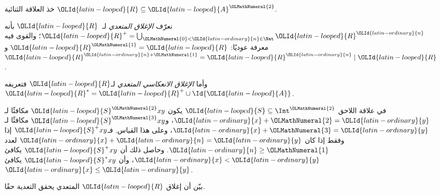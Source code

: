 \documentclass[../../../include/open-logic-section]{subfiles}
\begin{document}
\begin{defn}
خذ العلاقة الثنائية $\OLId{latin-looped}{R} \subseteq \OLId{latin-looped}{A}^\OLMathNumeral{2}$.

نعرّف \emph{الإغلاق المتعدي} لـ~$\OLId{latin-looped}{R}$ بأنه $\OLId{latin-looped}{R}^+ = \bigcup_{\OLMathNumeral{0} < \OLId{latin-ordinary}{n} \in
\Nat} \OLId{latin-looped}{R}^\OLId{latin-ordinary}{n}$؛ والقوى فيه معرفة عوديًا: $\OLId{latin-looped}{R}^\OLMathNumeral{1} = \OLId{latin-looped}{R}$ و$\OLId{latin-looped}{R}^{\OLId{latin-ordinary}{n}+\OLMathNumeral{1}} = \OLId{latin-looped}{R}^\OLId{latin-ordinary}{n}
\mid \OLId{latin-looped}{R}$.

وأما \emph{الإغلاق الانعكاسي المتعدي} لـ$\OLId{latin-looped}{R}$ فتعريفه $\OLId{latin-looped}{R}^* = \OLId{latin-looped}{R}^+ \cup
\Id{\OLId{latin-looped}{A}}$.
\end{defn}

\begin{ex}
في علاقة اللاحق $\OLId{latin-looped}{S} \subseteq \Int^\OLMathNumeral{2}$ يكون $\OLId{latin-looped}{S}^\OLMathNumeral{2}xy$ مكافئًا لـ$\OLId{latin-ordinary}{x} + \OLMathNumeral{2} =
\OLId{latin-ordinary}{y}$، و$\OLId{latin-looped}{S}^\OLMathNumeral{3}xy$ مكافئًا لـ$\OLId{latin-ordinary}{x} + \OLMathNumeral{3} = \OLId{latin-ordinary}{y}$، وعلى هذا القياس.
فـ$\OLId{latin-looped}{S}^+xy$ إذا وفقط إذا كان $\OLId{latin-ordinary}{x} + \OLId{latin-ordinary}{n} = \OLId{latin-ordinary}{y}$ لعدد $\OLId{latin-ordinary}{n} \geq \OLMathNumeral{1}$.
وحاصل ذلك أن $\OLId{latin-looped}{S}^+xy$ يكافئ $\OLId{latin-ordinary}{x} < \OLId{latin-ordinary}{y}$، وأن $\OLId{latin-looped}{S}^*xy$ يكافئ $\OLId{latin-ordinary}{x} \le
\OLId{latin-ordinary}{y}$.
\end{ex}

\begin{prob}
بيّن أن إغلاق $\OLId{latin-looped}{R}$ المتعدي يحقق التعدية حقًا.
\end{prob}
\end{document}
